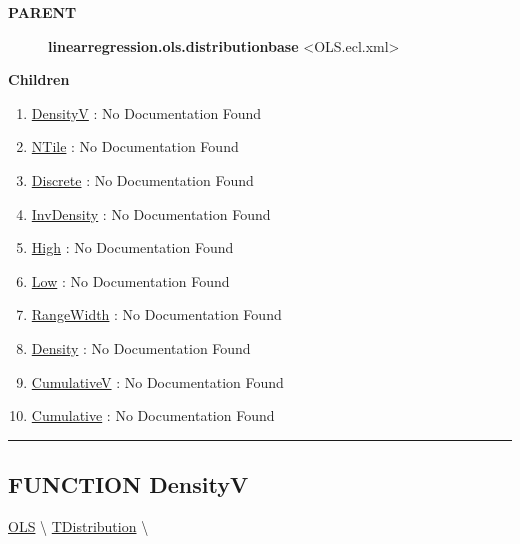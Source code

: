 \par
\begin{description}
\item [\colorbox{tagtype}{\color{white} \textbf{\textsf{PARENT}}}] \textbf{linearregression.ols.distributionbase} <OLS.ecl.xml>
\end{description}


\textbf{Children}
\begin{enumerate}
\item \hyperlink{ecldoc:linearregression.ols.distributionbase.densityv}{DensityV}
: No Documentation Found
\item \hyperlink{ecldoc:linearregression.ols.distributionbase.ntile}{NTile}
: No Documentation Found
\item \hyperlink{ecldoc:linearregression.ols.distributionbase.discrete}{Discrete}
: No Documentation Found
\item \hyperlink{ecldoc:linearregression.ols.tdistribution.invdensity}{InvDensity}
: No Documentation Found
\item \hyperlink{ecldoc:linearregression.ols.tdistribution.high}{High}
: No Documentation Found
\item \hyperlink{ecldoc:linearregression.ols.tdistribution.low}{Low}
: No Documentation Found
\item \hyperlink{ecldoc:linearregression.ols.tdistribution.rangewidth}{RangeWidth}
: No Documentation Found
\item \hyperlink{ecldoc:linearregression.ols.tdistribution.density}{Density}
: No Documentation Found
\item \hyperlink{ecldoc:linearregression.ols.tdistribution.cumulativev}{CumulativeV}
: No Documentation Found
\item \hyperlink{ecldoc:linearregression.ols.tdistribution.cumulative}{Cumulative}
: No Documentation Found
\end{enumerate}

\rule{\linewidth}{0.5pt}

\subsection*{\textsf{\colorbox{headtoc}{\color{white} FUNCTION}
DensityV}}

\hypertarget{ecldoc:linearregression.ols.distributionbase.densityv}{}
\hspace{0pt} \hyperlink{ecldoc:linearregression.ols}{OLS} \textbackslash 
\hspace{0pt} \hyperlink{ecldoc:linearregression.ols.tdistribution}{TDistribution} \textbackslash 

